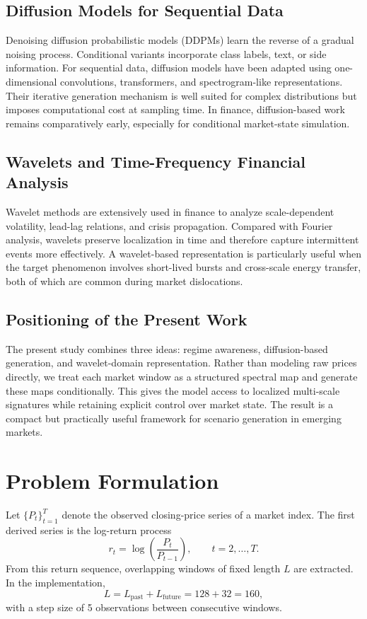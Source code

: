 \documentclass[conference]{IEEEtran}
\begin{document}
\subsection{Diffusion Models for Sequential Data}
Denoising diffusion probabilistic models (DDPMs) learn the reverse of a gradual noising process. Conditional variants incorporate class labels, text, or side information. For sequential data, diffusion models have been adapted using one-dimensional convolutions, transformers, and spectrogram-like representations. Their iterative generation mechanism is well suited for complex distributions but imposes computational cost at sampling time. In finance, diffusion-based work remains comparatively early, especially for conditional market-state simulation.

\subsection{Wavelets and Time-Frequency Financial Analysis}
Wavelet methods are extensively used in finance to analyze scale-dependent volatility, lead-lag relations, and crisis propagation. Compared with Fourier analysis, wavelets preserve localization in time and therefore capture intermittent events more effectively. A wavelet-based representation is particularly useful when the target phenomenon involves short-lived bursts and cross-scale energy transfer, both of which are common during market dislocations.

\subsection{Positioning of the Present Work}
The present study combines three ideas: regime awareness, diffusion-based generation, and wavelet-domain representation. Rather than modeling raw prices directly, we treat each market window as a structured spectral map and generate these maps conditionally. This gives the model access to localized multi-scale signatures while retaining explicit control over market state. The result is a compact but practically useful framework for scenario generation in emerging markets.

\section{Problem Formulation}
Let $\{P_t\}_{t=1}^{T}$ denote the observed closing-price series of a market index. The first derived series is the log-return process
\begin{equation}
r_t = \log\left(\frac{P_t}{P_{t-1}}\right), \qquad t=2,\dots,T.
\end{equation}
From this return sequence, overlapping windows of fixed length $L$ are extracted. In the implementation,
\begin{equation}
L = L_{\text{past}} + L_{\text{future}} = 128 + 32 = 160,
\end{equation}
with a step size of 5 observations between consecutive windows.
\end{document}
